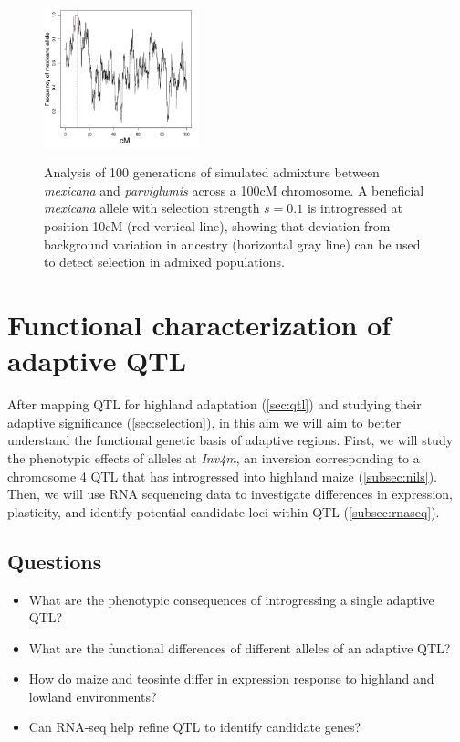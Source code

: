 \begin{figure}
  \centering
  \caption{Analysis of 100 generations of simulated admixture between \emph{mexicana} and \emph{parviglumis} across a 100cM chromosome.   A  beneficial \emph{mexicana} allele with selection strength $s=0.1$ is introgressed at position 10cM (red vertical line), showing that  deviation from background variation in ancestry (horizontal gray line) can be used to detect selection in admixed populations. } 
   \includegraphics[width=0.4\textwidth]{admix.png}
\label{fig:yaniv}
\end{figure}

\section{Functional characterization of adaptive QTL} \label{sec:funchar}

After mapping QTL for highland adaptation (\ref{sec:qtl}) and studying their adaptive significance (\ref{sec:selection}), in this aim we will aim to better understand the functional genetic basis of adaptive regions.  First, we will study the phenotypic effects of alleles at \emph{Inv4m}, an inversion corresponding to a chromosome 4 QTL that has introgressed into highland maize  (\ref{subsec:nils}).  Then, we will use RNA sequencing data to investigate differences in expression, plasticity, and identify potential candidate loci within QTL (\ref{subsec:rnaseq}).

\subsection{Questions}
\begin{itemize}[topsep=0pt,itemsep=-1ex,partopsep=1ex,parsep=1ex]
\item What are the phenotypic consequences of introgressing a single adaptive QTL?
\item What are the functional differences of different alleles of an adaptive QTL?
\item How do maize and teosinte differ in expression response to highland and lowland environments?
\item Can RNA-seq help refine QTL to identify candidate genes?
\end{itemize}

